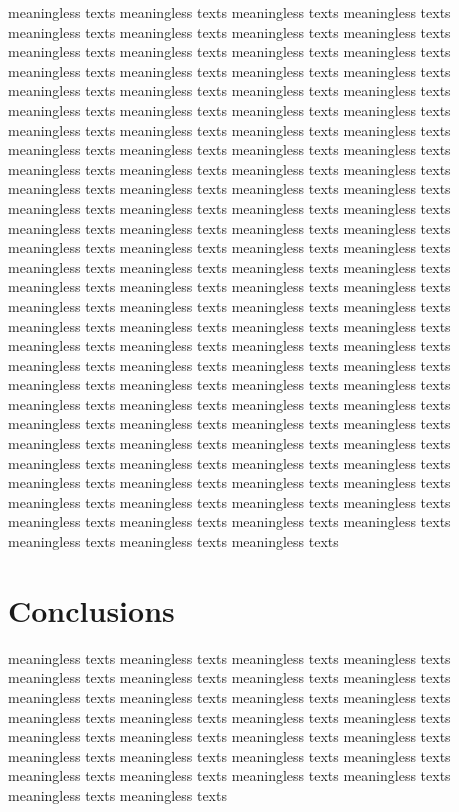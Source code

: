 \documentclass[12pt, twoside, notitlepage, twocolumn]{article}
\begin{document}
        meaningless texts meaningless texts meaningless texts meaningless texts meaningless texts 
        meaningless texts meaningless texts meaningless texts meaningless texts meaningless texts 
        meaningless texts meaningless texts meaningless texts meaningless texts meaningless texts 
        meaningless texts meaningless texts meaningless texts meaningless texts meaningless texts 
        meaningless texts meaningless texts meaningless texts meaningless texts meaningless texts 
        meaningless texts meaningless texts meaningless texts meaningless texts meaningless texts 
        meaningless texts meaningless texts meaningless texts meaningless texts meaningless texts 
        meaningless texts meaningless texts meaningless texts meaningless texts meaningless texts 
        meaningless texts meaningless texts meaningless texts meaningless texts meaningless texts 
        meaningless texts meaningless texts meaningless texts meaningless texts meaningless texts 
        meaningless texts meaningless texts meaningless texts meaningless texts meaningless texts 
        meaningless texts meaningless texts meaningless texts meaningless texts meaningless texts 
        meaningless texts meaningless texts meaningless texts meaningless texts meaningless texts 
        meaningless texts meaningless texts meaningless texts meaningless texts meaningless texts 
        meaningless texts meaningless texts meaningless texts meaningless texts meaningless texts 
        meaningless texts meaningless texts meaningless texts meaningless texts meaningless texts 
        meaningless texts meaningless texts 
        meaningless texts meaningless texts meaningless texts 
        meaningless texts meaningless texts meaningless texts meaningless texts meaningless texts 
        meaningless texts meaningless texts meaningless texts meaningless texts meaningless texts 
        meaningless texts meaningless texts meaningless texts meaningless texts meaningless texts 
        meaningless texts meaningless texts meaningless texts meaningless texts meaningless texts 
        meaningless texts meaningless texts meaningless texts meaningless texts meaningless texts 
        meaningless texts 
        
        \section{Conclusions}
        meaningless texts meaningless texts meaningless texts meaningless texts meaningless texts 
        meaningless texts meaningless texts meaningless texts meaningless texts meaningless texts 
        meaningless texts meaningless texts meaningless texts meaningless texts meaningless texts 
        meaningless texts meaningless texts meaningless texts meaningless texts meaningless texts 
        meaningless texts meaningless texts meaningless texts meaningless texts meaningless texts 
        meaningless texts meaningless texts meaningless texts meaningless texts meaningless texts 
\end{document}

